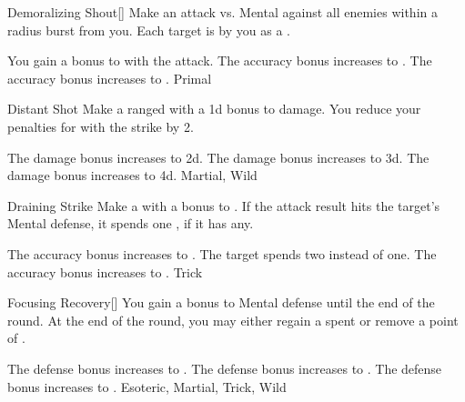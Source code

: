 \lowercase{\hypertarget{maneuver:Demoralizing Shout}{}}\label{maneuver:Demoralizing Shout}
\hypertarget{maneuver:Demoralizing Shout}{}
\begin{apability}{Demoralizing Shout}[]
Make an attack vs. Mental against all enemies within a \arealarge radius burst from you.
\hit Each target is  by you as a .

\rankline
{} You gain a  bonus to  with the attack.
 The accuracy bonus increases to .
 The accuracy bonus increases to .
 Primal
\end{apability}
\vspace{0.25em}



\lowercase{\hypertarget{maneuver:Distant Shot}{}}\label{maneuver:Distant Shot}
\hypertarget{maneuver:Distant Shot}{}
\begin{apability}{Distant Shot}
Make a ranged  with a \plus1d bonus to damage.
You reduce your penalties for  with the strike by 2.

\rankline
{} The damage bonus increases to \plus2d.
 The damage bonus increases to \plus3d.
 The damage bonus increases to \plus4d.
 Martial, Wild
\end{apability}
\vspace{0.25em}



\lowercase{\hypertarget{maneuver:Draining Strike}{}}\label{maneuver:Draining Strike}
\hypertarget{maneuver:Draining Strike}{}
\begin{apability}{Draining Strike}
Make a  with a  bonus to .
If the attack result hits the target's Mental defense,
it spends one , if it has any.

\rankline
{} The accuracy bonus increases to .
 The target spends two  instead of one.
 The accuracy bonus increases to .
 Trick
\end{apability}
\vspace{0.25em}



\lowercase{\hypertarget{maneuver:Focusing Recovery}{}}\label{maneuver:Focusing Recovery}
\hypertarget{maneuver:Focusing Recovery}{}
\begin{freeability}{Focusing Recovery}[]
You gain a  bonus to Mental defense until the end of the round.
At the end of the round, you may either regain a spent  or remove a point of .

\rankline
{} The defense bonus increases to .
 The defense bonus increases to .
 The defense bonus increases to .
 Esoteric, Martial, Trick, Wild
\end{freeability}
\vspace{0.25em}



